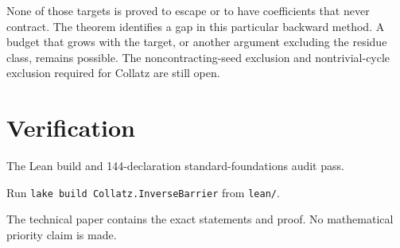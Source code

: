 \documentclass[10pt]{article}
\begin{document}
None of those targets is proved to escape or to have coefficients that
never contract. The theorem identifies a gap in this particular backward
method. A budget that grows with the target, or another argument excluding
the residue class, remains possible. The noncontracting-seed exclusion and
nontrivial-cycle exclusion required for Collatz are still open.

\section*{Verification}
The Lean build and 144-declaration standard-foundations audit pass.
{\raggedright Run \texttt{lake build Collatz.InverseBarrier} from
\texttt{lean/}.\par}
The technical paper contains the exact statements and proof. No mathematical
priority claim is made.
\end{document}
